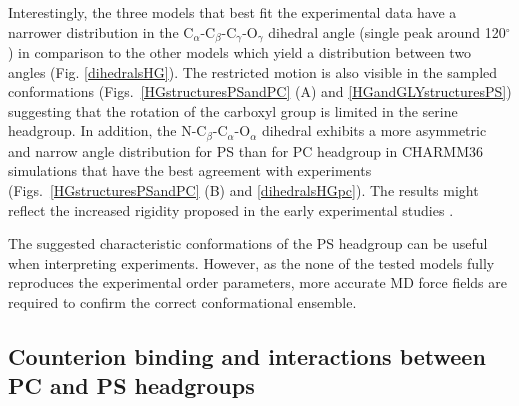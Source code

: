 \documentclass[aps,prl,superscriptaddress,twocolumn]{revtex4}
\begin{document}
Interestingly, the three models that best fit the experimental data have a narrower distribution in the C$_\alpha$-C$_\beta$-C$_\gamma$-O$_\gamma$
dihedral angle (single peak around 120$^{\circ}$) in comparison to the other models which yield a distribution between two angles (Fig. \ref{dihedralsHG}).
The restricted motion is also visible in the sampled conformations (Figs.~\ref{HGstructuresPSandPC} (A) and \ref{HGandGLYstructuresPS})
suggesting that the rotation of the carboxyl group is limited in the serine headgroup.
In addition, the N-C$_\beta$-C$_\alpha$-O$_\alpha$ dihedral exhibits a more asymmetric
and narrow angle distribution for PS than for PC headgroup in
CHARMM36 simulations that have the best agreement with experiments
(Figs.~\ref{HGstructuresPSandPC} (B) and \ref{dihedralsHGpc}).
The results might reflect the increased rigidity proposed in the early experimental studies \cite{browning80,buldt81}.

The suggested characteristic conformations of the PS headgroup can be useful when interpreting experiments. However, as the none of the tested models fully reproduces the experimental order parameters, more accurate MD force fields are required to confirm the correct conformational ensemble.



\subsection{Counterion binding and interactions between PC and PS headgroups}\label{ciBINDINGsection}
\end{document}
